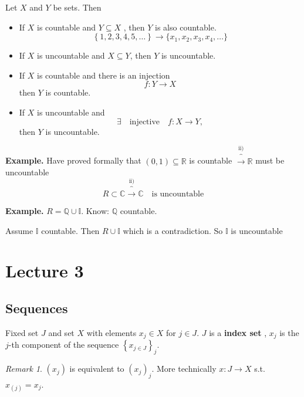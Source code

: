 \documentclass{article}
\theoremstyle{remark}
\newtheorem*{remark}{Remark}
\begin{document}
\newpage
  \begin{lemma}
    Let $X$ and $Y$ be sets. Then 
    \begin{itemize}
      \item If $X$ is countable and $ Y \subseteq  X$ , then $Y$ is also countable. \[
      \left\{ 1,2,3,4,5, \ldots \right\} \to \{x_{1}, x_{2} , x_{3}, x_{4} , \ldots\} 
      \] 
    \item If $X$ is uncountable and $X \subseteq  Y$, then $Y$ is uncountable. 
    \item If $X$ is countable and there is an injection \[
    f: Y \to X   
    \] 
    then $Y$ is countable.
  \item If $X$ is uncountable and \[
  \exists \quad  \text{injective} \quad  f: X \to Y,   
  \] 
  then $Y$ is uncountable.
    \end{itemize}
  \end{lemma}
   \begin{tcolorbox}
     \textbf{Example.} Have proved formally that $\left( 0,1 \right) \subseteq  \mathbb{R} $ is countable $\overbrace{\to}^\text{ii)}  \mathbb{R} $ must be uncountable \[
       R \subset \mathbb{C}  \overbrace{\longrightarrow}^\text{ii)} \mathbb{C} \quad \text{is uncountable} 
     \] 
   \end{tcolorbox}

   \begin{tcolorbox}
     \textbf{Example.} $R = \mathbb{Q}  \cup \mathbb{I}$. Know: $\mathbb{Q} $ countable.  \par
     Assume $\mathbb{I}$ countable. Then $R \cup \mathbb{I}$ which is a contradiction. So $\mathbb{I}$ is uncountable
   \end{tcolorbox}

\newpage
\section{Lecture 3}%
\label{sec:lecture_3}

\subsection{Sequences}%
\label{sub:sequences}

Fixed set $J$ and set $X$ with elements $x_{j} \in X $ for $j \in J$. $J$ is a \textbf{index set} , $x_{j}$ is the $j$-th component of the sequence $\left\{ x_{j \in J} \right\}_{j}$.  

\begin{remark}
  $\left( x_{j} \right) $ is equivalent to $\left( x_{j} \right)_{j}$. More technically $x: J \to  X$ s.t. $x_{\left( j \right)} = x_{j}$.
\end{remark}
\end{document}
